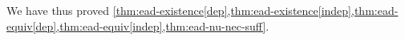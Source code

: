 \documentclass[a4paper,final]{article}
\newtheorem{proposition}[theorem]{Proposition}
\renewcommand\P{\mathbb{P}} %
\newcommand\EU{\mathrm{EU}}
\newcommand\EAd{\mathrm{EAd}}
\newcommand{\D}{\mathcal{D}}
\newcommand{\Decs}{\mathcal{D}}
\renewcommand\S{\mathcal{S}}
\newcommand\s{\mathsf{s}}
\newcommand{\n}{\mathsf{n}}
\newcommand\Nu{\mathcal{N}}
\newcommand{\IB}{\mathbb{B}}
\newcommand{\IP}{\P}
\newcommand{\Strategies}{\S}
\newenvironment{CCM rewritten}
{\begingroup\color{blue}} %
{\endgroup}              %
\begin{document}
We have thus proved \cref{thm:ead-existence[dep],thm:ead-existence[indep],thm:ead-equiv[dep],thm:ead-equiv[indep],thm:ead-nu-nec-suff}. 


%
%
%	
%	
%
%
%	
%
%	
%	
\end{document}
